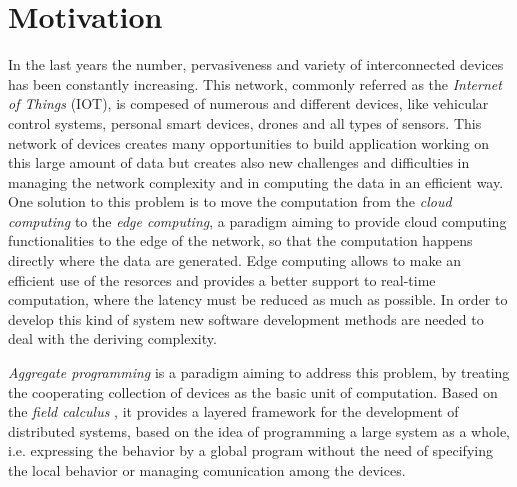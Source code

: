 \section{Motivation}
In the last years the number, pervasiveness and variety of interconnected devices has been constantly increasing. This network, commonly referred as the \textit{Internet of Things} (IOT), is compesed of numerous and different devices, like vehicular control systems, personal smart devices, drones and all types of sensors. This network of devices creates many opportunities to build application working on this large amount of data but creates also new challenges and difficulties in managing the network complexity and in computing the data in an efficient way. One solution to this problem is to move the computation from the \textit{cloud computing} to the \textit{edge computing}, a paradigm aiming to provide cloud computing functionalities to the edge of the network, so that the computation happens directly where the data are generated. Edge computing allows to make an efficient use of the resorces and provides a better support to real-time computation, where the latency must be reduced as much as possible. In order to develop this kind of system new software development methods are needed to deal with the deriving complexity.

\textit{Aggregate programming} \cite{Aggregate01} is a paradigm aiming to address this problem, by treating the cooperating collection of devices as the basic unit of computation. Based on the \textit{field calculus} \cite{FieldCalculus}, it provides a layered framework for the development of distributed systems, based on the idea of programming a large system as a whole, i.e. expressing the behavior by a global program without the need of specifying the local behavior or managing comunication among the devices.

